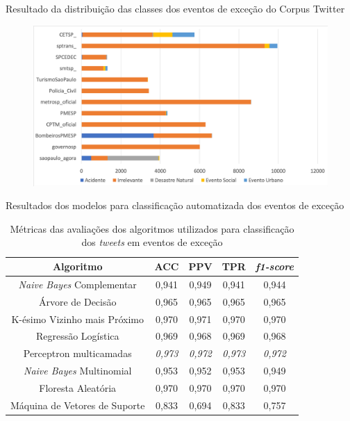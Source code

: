 \documentclass{beamer}
\begin{document}
\begin{frame}{Resultado da distribuição das classes dos eventos de exceção do Corpus Twitter}
\begin{figure}[!htb]%
	\centering
		\includegraphics[width=1\linewidth]{tweets_distribution_pt_.png}
	\label{fig:pizza_bus}
\end{figure}
\end{frame}
\begin{frame}{Resultados dos modelos para classificação automatizada dos eventos de exceção}
\begin{table}[!htb]
\centering
\caption {Métricas das avaliações dos algoritmos utilizados para classificação dos \textit{tweets} em eventos de exceção}
\label {tab:metrics}
\begin{tabular}{c|c|c|c|c}
\toprule
\textbf{Algoritmo} & \textbf{ACC} & \textbf{PPV} & \textbf{TPR} & \textbf{\textit{f1-score}} \\
\midrule
\textit{Naive Bayes} Complementar & 0,941 & 0,949 & 0,941 & 0,944 \\
\hline
Árvore de Decisão & 0,965 & 0,965 & 0,965 & 0,965 \\
\hline
K-ésimo Vizinho mais Próximo & 0,970 & 0,971 & 0,970 & 0,970 \\
\hline
Regressão Logística & 0,969 & 0,968 & 0,969 & 0,968 \\
\hline
\alert{Perceptron multicamadas} & \textit{\alert{0,973}} & \textit{\alert{0,972}} & \textit{\alert{0,973}} & \textit{\alert{0,972}} \\
\hline
\textit{Naive Bayes} Multinomial & 0,953 & 0,952 & 0,953 & 0,949 \\
\hline
Floresta Aleatória & 0,970 & 0,970 & 0,970 & 0,970 \\
\hline
Máquina de Vetores de Suporte & 0,833 & 0,694 & 0,833 & 0,757 \\
\bottomrule
\end{tabular}
\end{table}
\end{frame}
\end{document}
